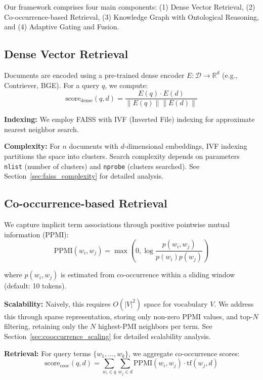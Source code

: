 \documentclass[11pt,a4paper]{article}
\begin{document}
Our framework comprises four main components: (1) Dense Vector Retrieval, (2) Co-occurrence-based Retrieval, (3) Knowledge Graph with Ontological Reasoning, and (4) Adaptive Gating and Fusion.

\subsection{Dense Vector Retrieval}
\label{sec:dense_retrieval}

Documents are encoded using a pre-trained dense encoder $E: \mathcal{D} \rightarrow \mathbb{R}^d$ (e.g., Contriever, BGE). For a query $q$, we compute:
\begin{equation}
\text{score}_{\text{dense}}(q, d) = \frac{E(q) \cdot E(d)}{\|E(q)\| \|E(d)\|}
\end{equation}

\textbf{Indexing:} We employ FAISS \citep{johnson2019billion} with IVF (Inverted File) indexing for approximate nearest neighbor search.

\textbf{Complexity:} For $n$ documents with $d$-dimensional embeddings, IVF indexing partitions the space into clusters. Search complexity depends on parameters \texttt{nlist} (number of clusters) and \texttt{nprobe} (clusters searched). See Section~\ref{sec:faiss_complexity} for detailed analysis.

\subsection{Co-occurrence-based Retrieval}
\label{sec:cooccurrence}

We capture implicit term associations through positive pointwise mutual information (PPMI):
\begin{equation}
\text{PPMI}(w_i, w_j) = \max\left(0, \log \frac{p(w_i, w_j)}{p(w_i) p(w_j)}\right)
\end{equation}

where $p(w_i, w_j)$ is estimated from co-occurrence within a sliding window (default: 10 tokens).

\textbf{Scalability:} Naively, this requires $O(|V|^2)$ space for vocabulary $V$. We address this through sparse representation, storing only non-zero PPMI values, and top-$N$ filtering, retaining only the $N$ highest-PMI neighbors per term. See Section~\ref{sec:cooccurrence_scaling} for detailed scalability analysis.

\textbf{Retrieval:} For query terms $\{w_1, \ldots, w_k\}$, we aggregate co-occurrence scores:
\begin{equation}
\text{score}_{\text{cooc}}(q, d) = \sum_{w_i \in q} \sum_{w_j \in d} \text{PPMI}(w_i, w_j) \cdot \text{tf}(w_j, d)
\end{equation}
\end{document}
